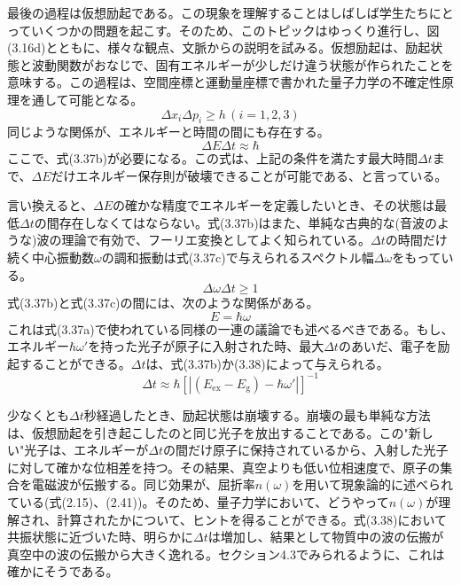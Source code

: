 \documentclass[11pt,a4j,uplatex]{jsarticle}
\begin{document}
最後の過程は仮想励起である。この現象を理解することはしばしば学生たちにとっていくつかの問題を起こす。そのため、このトピックはゆっくり進行し、図(3.16d)とともに、様々な観点、文脈からの説明を試みる。仮想励起は、励起状態と波動関数がおなじで、固有エネルギーが少しだけ違う状態が作られたことを意味する。この過程は、空間座標と運動量座標で書かれた量子力学の不確定性原理を通して可能となる。
\begin{equation}
  \Delta x_i\Delta p_i\geq h \,(i=1,2,3)\tag{3.37a}
\end{equation}
同じような関係が、エネルギーと時間の間にも存在する。
\begin{equation}
  \Delta E\Delta t\approx\hbar\tag{3.37b}
\end{equation}
ここで、式(3.37b)が必要になる。この式は、上記の条件を満たす最大時間$\Delta t$まで、$\Delta E$だけエネルギー保存則が破壊できることが可能である、と言っている。%

言い換えると、$\Delta E$の確かな精度でエネルギーを定義したいとき、その状態は最低$\Delta t$の間存在しなくてはならない。式(3.37b)はまた、単純な古典的な(音波のような)波の理論で有効で、フーリエ変換としてよく知られている。$\Delta t$の時間だけ続く中心振動数$\omega$の調和振動は式(3.37c)で与えられるスペクトル幅$\Delta \omega$をもっている。
\begin{equation}
  \Delta\omega\Delta t\geq1\tag{3.37c}
\end{equation}
式(3.37b)と式(3.37c)の間には、次のような関係がある。
\begin{equation}
  E=\hbar\omega\tag{3.37d}
\end{equation}
これは式(3.37a)で使われている同様の一連の議論でも述べるべきである。もし、エネルギー$\hbar\omega'$を持った光子が原子に入射された時、最大$\Delta t$のあいだ、電子を励起することができる。$\Delta t$は、式(3.37b)か(3.38)によって与えられる。
\begin{equation}
  \Delta t\approx\hbar[\left|(E_{\mathrm{ex}}-E_{\mathrm{g}})-\hbar\omega'\right|]^{-1}\tag{3.38}
\end{equation}

少なくとも$\Delta t$秒経過したとき、励起状態は崩壊する。崩壊の最も単純な方法は、仮想励起を引き起こしたのと同じ光子を放出することである。この"新しい"光子は、エネルギーが$\Delta t$の間だけ原子に保持されているから、入射した光子に対して確かな位相差を持つ。その結果、真空よりも低い位相速度で、原子の集合を電磁波が伝搬する。同じ効果が、屈折率$n(\omega)$を用いて現象論的に述べられている(式(2.15)、(2.41))。そのため、量子力学において、どうやって$n(\omega)$が理解され、計算されたかについて、ヒントを得ることができる。式(3.38)において共振状態に近づいた時、明らかに$\Delta t$は増加し、結果として物質中の波の伝搬が真空中の波の伝搬から大きく逸れる。セクション4.3でみられるように、これは確かにそうである。
\end{document}
